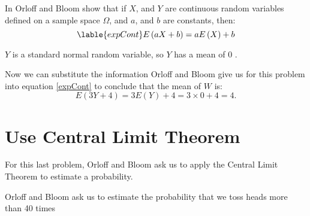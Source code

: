 \documentclass[a4paper,11pt]{article}
\begin{document}
In \cite{reading6a} Orloff and Bloom show that if $X$, and $Y$ are continuous
random variables defined on a sample space $\Omega$, and $a$, and $b$ are
constants, then:
\begin{equation} \lable{expCont}
  E\left(aX +b \right)=aE\left(X \right) + b
\end{equation}

$Y$ is a standard normal random variable, so $Y$ has a mean of $0$
\cite{reading6a}.

Now we can substitute the information Orloff and Bloom give us for this problem
into equation \ref{expCont} to conclude that the mean of $W$ is:
\begin{equation}
  E\left( 3Y + 4 \right) = 3E\left(Y \right) + 4 = 3\times0 + 4 = 4.
\end{equation}

\section{Use Central Limit Theorem}
For this last problem, Orloff and Bloom ask us to apply the Central Limit Theorem
to estimate a probability.

Orloff and Bloom ask us to estimate the probability that we toss heads more than 40 times

\printbibliography{}
\end{document}
